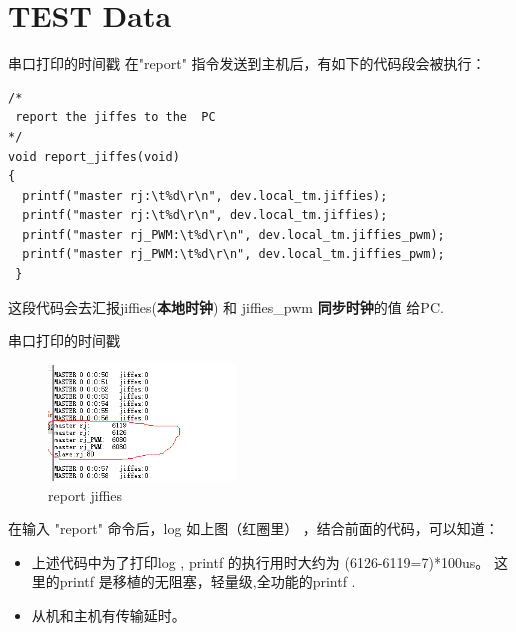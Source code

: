 \section{TEST Data}



\begin{frame}[fragile]{串口打印的时间戳}
  在"report" 指令发送到主机后，有如下的代码段会被执行：
\begin{lstlisting}
/*
 report the jiffes to the  PC
*/
void report_jiffes(void)
{
  printf("master rj:\t%d\r\n", dev.local_tm.jiffies);
  printf("master rj:\t%d\r\n", dev.local_tm.jiffies);
  printf("master rj_PWM:\t%d\r\n", dev.local_tm.jiffies_pwm);
  printf("master rj_PWM:\t%d\r\n", dev.local_tm.jiffies_pwm);
 }
\end{lstlisting}

这段代码会去汇报jiffies(\textbf{本地时钟}) 和 jiffies\_pwm  {\textbf{同步时钟}}的值
给PC.
\end{frame}



\begin{frame}[fragile]{串口打印的时间戳}
  \begin{figure}[htbp]
  \begin{center}
  \includegraphics[width=5cm]{img/report}
  \caption{report jiffies}
  \label{report}
  \end{center}
  \vspace{-0.5em}
  \end{figure}
在输入 "report" 命令后，log 如上图（红圈里） ，结合前面的代码，可以知道：
\begin{itemize}
\item 上述代码中为了打印log , printf 的执行用时大约为 (6126-6119=7)*100us。
这里的printf 是移植的无阻塞，轻量级,全功能的printf .

\item 从机和主机有传输延时。
\end{itemize}

\end{frame}





